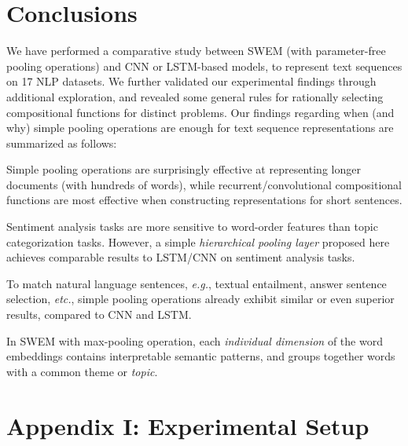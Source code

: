 \documentclass[11pt,a4paper]{article}
\begin{document}
\section{Conclusions}
\vspace{-2mm}
We have performed a comparative study between SWEM (with parameter-free pooling operations) and CNN or LSTM-based models, to represent text sequences on 17 NLP datasets.
We further validated our experimental findings through additional exploration, and revealed some general rules for rationally selecting compositional functions for distinct problems.
Our findings regarding when (and why) simple pooling operations are enough for text sequence representations are summarized as follows: \nocite{shen2017adaptive} \par 
\smallskip 
\noindent Simple pooling operations are surprisingly effective at representing longer documents (with hundreds of words), while recurrent/convolutional compositional functions are most effective when constructing representations for short sentences.\par
\smallskip 
\noindent Sentiment analysis tasks are more sensitive to word-order features than topic categorization tasks. However, a simple \emph{hierarchical pooling layer} proposed here achieves comparable results to LSTM/CNN on sentiment analysis tasks.  \par
\smallskip 
\noindent To match natural language sentences, \emph{e.g.}, textual entailment, answer sentence selection, \emph{etc.}, simple pooling operations already exhibit similar or even superior results, compared to CNN and LSTM.\par
\smallskip 
\noindent In SWEM with max-pooling operation, each \emph{individual dimension} of the word embeddings contains interpretable semantic patterns, and groups together words with a common theme or \emph{topic}.\par
\smallskip 







\clearpage

\section*{Appendix I: Experimental Setup}
\end{document}
